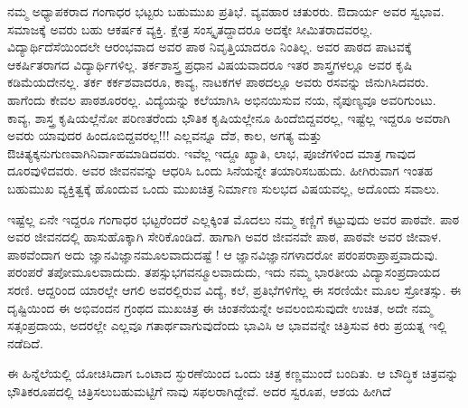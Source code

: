 {ನಮ್ಮ ಅಧ್ಯಾಪಕರಾದ ಗಂಗಾಧರ ಭಟ್ಟರು ಬಹುಮುಖ ಪ್ರತಿಭೆ. ವ್ಯವಹಾರ ಚತುರರು. ಔದಾರ್ಯ ಅವರ ಸ್ವಭಾವ. ಸಮಾಜಕ್ಕೆ ಅವರು ಬಹು ಆಕರ್ಷಕ ವ್ಯಕ್ತಿ. ಕ್ಷೇತ್ರ ಸಂಸ್ಕೃತದ್ದಾದರೂ ಅದಕ್ಕೇ ಸೀಮಿತರಾದವರಲ್ಲ. ವಿದ್ಯಾರ್ಥಿದೆಸೆಯಿಂದಲೇ ಆರಂಭವಾದ ಅವರ ಪಾಠ ನಿವೃತ್ತಿಯಾದರೂ ನಿಂತಿಲ್ಲ. ಅವರ ಪಾಠದ ಪಾಟವಕ್ಕೆ ಆಕರ್ಷಿತರಾಗದ ವಿದ್ಯಾರ್ಥಿಗಳಿಲ್ಲ. ತರ್ಕಶಾಸ್ತ್ರ ಪ್ರಧಾನ ವಿಷಯವಾದರೂ ಇತರ ಶಾಸ್ತ್ರಗಳಲ್ಲೂ ಅವರ ಕೃಷಿ ಕಡಿಮೆಯದೇನಲ್ಲ. ತರ್ಕ ಕರ್ಕಶವಾದರೂ, ಕಾವ್ಯ, ನಾಟಕಗಳ ಪಾಠದಲ್ಲೂ ಅವರು ರಸವನ್ನು ಜಿನುಗಿಸಿದವರು. ಹಾಗೆಂದು ಕೇವಲ ಪಾಠಶೂರರಲ್ಲ. ವಿದ್ಯೆಯನ್ನು  ಕಲೆಯಾಗಿಸಿ ಅಭಿನಯಿಸುವ ನಯ, ನೈಪುಣ್ಯವೂ ಅವರಿಗುಂಟು. ಕಾವ್ಯ, ಶಾಸ್ತ್ರ ಕೃಷಿಯಲ್ಲೆನೋ ಪರಿಣತರೆಂದು ಭೌತಿಕ ಕೃಷಿಯಲ್ಲೇನೂ ಹಿಂದೆಬಿದ್ದವರಲ್ಲ, ಇಷ್ಟೆಲ್ಲ ಇದ್ದರೂ ಅವರಾಗಿ ಅವರು ಯಾವುದರ ಹಿಂದೂ\break ಬಿದ್ದವರಲ್ಲ!!! ಎಲ್ಲವನ್ನೂ ದೆಶ, ಕಾಲ, ಅಗತ್ಯ ಮತ್ತು ಔಚಿತ್ಯಕ್ಕನುಗುಣವಾಗಿ\break ನಿರ್ವಾಹಮಾಡಿದವರು. ಇವೆಲ್ಲ ಇದ್ದೂ ಖ್ಯಾತಿ, ಲಾಭ, ಪೂಜೆಗಳಿಂದ ಮಾತ್ರ ಗಾವುದ ದೂರವುಳಿದವರು. ಅವರ ಜೀವನವನ್ನು ಆಧರಿಸಿ ಒಂದು ಸಿನೆಯನ್ನೇ ತಯಾರಿಸಬಹುದು. ಹೀಗಿರುವಾಗ ಇಂತಹ ಬಹುಮುಖ ವ್ಯಕ್ತಿತ್ವಕ್ಕೆ ಹೊಂದುವ ಒಂದು ಮುಖಚಿತ್ರ ನಿರ್ಮಾಣ ಸುಲಭದ ವಿಷಯವಲ್ಲ, ಅದೊಂದು ಸವಾಲು.

ಇಷ್ಟೆಲ್ಲ ಏನೇ ಇದ್ದರೂ ಗಂಗಾಧರ ಭಟ್ಟರೆಂದರೆ ಎಲ್ಲಕ್ಕಿಂತ ಮೊದಲು ನಮ್ಮ ಕಣ್ಣಿಗೆ ಕಟ್ಟುವುದು ಅವರ ಪಾಠವೇ. ಪಾಠ ಅವರ ಜೀವನದಲ್ಲಿ ಹಾಸು\enginline{-}ಹೊಕ್ಕಾಗಿ ಸೇರಿಕೊಂಡಿದೆ. ಹಾಗಾಗಿ ಅವರ ಜೀವನವೇ ಪಾಠ, ಪಾಠವೇ ಅವರ ಜೀವಾಳ. ಪಾಠವೆಂದಾಗ ಅದು ಜ್ಞಾನ\enginline{-}ವಿಜ್ಞಾನಮೂಲವಾದುದಷ್ಟೆ ! ಆ ಜ್ಞಾನ\enginline{-}ವಿಜ್ಞಾನಗಳಾದರೋ ಪರಂಪರಾಪ್ರಾಪ್ತವಾದುವು. ಪರಂಪರೆ ತಪೋಮೂಲವಾದುದು. ತಪಸ್ಸು\break ಭಗವನ್ಮೂಲವಾದುದು, ಇದು ನಮ್ಮ ಭಾರತೀಯ ವಿದ್ಯಾಸಂಪ್ರದಾಯದ ಸರಣಿ. ಆದ್ದರಿಂದ ಯಾರಲ್ಲೇ ಆಗಲಿ ಅವರಲ್ಲಿರುವ ವಿದ್ಯೆ, ಕಲೆ, ಪ್ರತಿಭೆಗಳಿಗೆಲ್ಲ ಈ ಸರಣಿಯೇ ಮೂಲ ಸ್ರೋತಸ್ಸು. ಈ ದೃಷ್ಟಿಯಿಂದ ಈ ಅಭಿವಂದನ ಗ್ರಂಥದ ಮುಖಚಿತ್ರ ಈ ಚಿಂತನೆಯನ್ನೇ ಅವಲಂಬಿಸುವುದೇ ಉಚಿತ, ಅದೇ ನಮ್ಮ ಸತ್ಸಂಪ್ರದಾಯ, ಅದರಲ್ಲೇ ಎಲ್ಲವೂ ಗತಾರ್ಥವಾಗುವುದೆಂದು ಭಾವಿಸಿ ಆ ಭಾವವನ್ನೇ ಚಿತ್ರಿಸುವ ಕಿರು ಪ್ರಯತ್ನ ಇಲ್ಲಿ ನಡೆದಿದೆ.

ಈ ಹಿನ್ನೆಲೆಯಲ್ಲಿ ಯೋಚಿಸಿದಾಗ ಒಂಟಾದ ಸ್ಫುರಣೆಯಿಂದ ಒಂದು ಚಿತ್ರ ಕಣ್ಣಮುಂದೆ ಬಂದಿತು. ಆ ಬೌದ್ಧಿಕ ಚಿತ್ರವನ್ನು ಭೌತಿಕರೂಪದಲ್ಲಿ ಚಿತ್ರಿಸಲು\break ಬಹುಮಟ್ಟಿಗೆ ನಾವು ಸಫಲರಾಗಿದ್ದೇವೆ. ಅದರ ಸ್ವರೂಪ, ಆಶಯ ಹೀಗಿದೆ  \enginline{-} 

}
